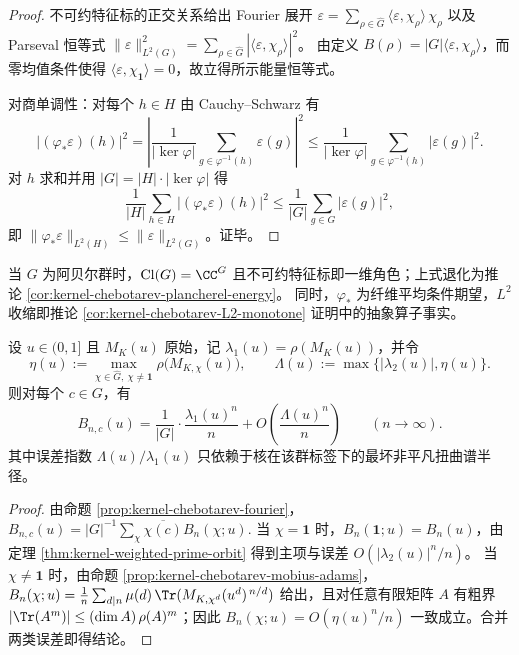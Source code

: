 \begin{proof}
不可约特征标的正交关系给出 Fourier 展开
\(
\varepsilon=\sum_{\rho\in\widehat G}\langle \varepsilon,\chi_\rho\rangle\,\chi_\rho
\)
以及 Parseval 恒等式
\(
\|\varepsilon\|_{L^2(G)}^2=\sum_{\rho\in\widehat G}|\langle \varepsilon,\chi_\rho\rangle|^2
\)。
由定义 \(B(\rho)=|G|\langle \varepsilon,\chi_\rho\rangle\)，而零均值条件使得 \(\langle \varepsilon,\chi_{\mathbf{1}}\rangle=0\)，故立得所示能量恒等式。

对商单调性：对每个 \(h\in H\) 由 Cauchy--Schwarz 有
\[
\bigl|(\varphi_\ast\varepsilon)(h)\bigr|^2
=\left|\frac{1}{|\ker\varphi|}\sum_{g\in\varphi^{-1}(h)}\varepsilon(g)\right|^2
\le
\frac{1}{|\ker\varphi|}\sum_{g\in\varphi^{-1}(h)}|\varepsilon(g)|^2.
\]
对 \(h\) 求和并用 \(|G|=|H|\cdot|\ker\varphi|\) 得
\[
\frac{1}{|H|}\sum_{h\in H}\bigl|(\varphi_\ast\varepsilon)(h)\bigr|^2
\le
\frac{1}{|G|}\sum_{g\in G}|\varepsilon(g)|^2,
\]
即 \(\|\varphi_\ast\varepsilon\|_{L^2(H)}\le \|\varepsilon\|_{L^2(G)}\)。证毕。
\end{proof}

\begin{remark}[对照：阿贝尔情形即角色基能量分解]\label{rem:kernel-chebotarev-plancherel-nonabelian-abelian}
当 \(G\) 为阿贝尔群时，\(\mathrm{Cl}(G)=\CC^{G}\) 且不可约特征标即一维角色；上式退化为推论 \ref{cor:kernel-chebotarev-plancherel-energy}。
同时，\(\varphi_\ast\) 为纤维平均条件期望，\(L^2\) 收缩即推论 \ref{cor:kernel-chebotarev-L2-monotone} 证明中的抽象算子事实。
\end{remark}

\begin{theorem}\label{thm:kernel-chebotarev-exp}
设 $u\in(0,1]$ 且 $M_K(u)$ 原始，记 $\lambda_1(u)=\rho(M_K(u))$，并令
\[
\eta(u):=\max_{\chi\in\widehat G,\ \chi\ne\mathbf{1}}\rho\bigl(M_{K,\chi}(u)\bigr),
\qquad
\Lambda(u):=\max\{|\lambda_2(u)|,\eta(u)\}.
\]
则对每个 $c\in G$，有
\[
B_{n,c}(u)=\frac{1}{|G|}\cdot\frac{\lambda_1(u)^n}{n}+O\!\left(\frac{\Lambda(u)^n}{n}\right)\qquad(n\to\infty).
\]
其中误差指数 $\Lambda(u)/\lambda_1(u)$ 只依赖于核在该群标签下的最坏非平凡扭曲谱半径。
\end{theorem}

\begin{proof}
由命题 \ref{prop:kernel-chebotarev-fourier}，
\(
B_{n,c}(u)=|G|^{-1}\sum_{\chi}\overline{\chi(c)}B_n(\chi;u).
\)
当 $\chi=\mathbf{1}$ 时，$B_n(\mathbf{1};u)=B_n(u)$，由定理 \ref{thm:kernel-weighted-prime-orbit} 得到主项与误差 $O(|\lambda_2(u)|^n/n)$。
当 $\chi\ne\mathbf{1}$ 时，由命题 \ref{prop:kernel-chebotarev-mobius-adams}，
\(
B_n(\chi;u)=\frac{1}{n}\sum_{d\mid n}\mu(d)\,\Tr(M_{K,\chi^d}(u^d)^{\,n/d})
\)
给出，且对任意有限矩阵 $A$ 有粗界 $|\Tr(A^m)|\le (\dim A)\,\rho(A)^m$；因此
\(
B_n(\chi;u)=O(\eta(u)^n/n)
\)
一致成立。合并两类误差即得结论。
\end{proof}

